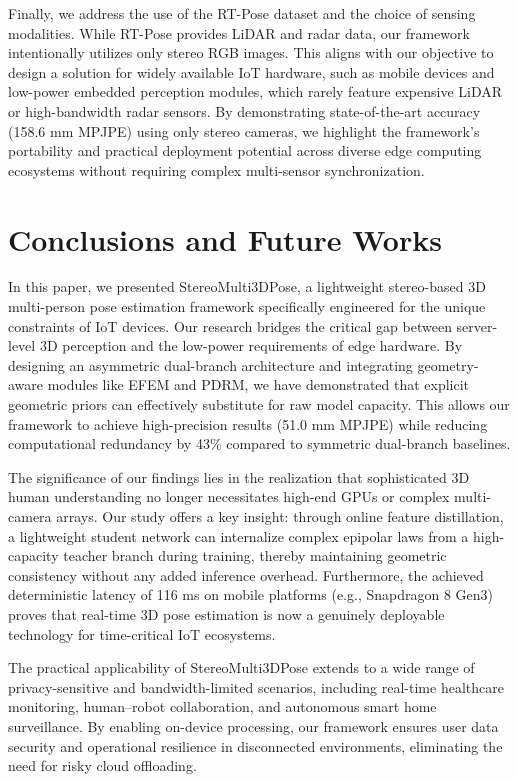 \documentclass[journal]{IEEEtran}
\begin{document}
Finally, we address the use of the RT-Pose dataset and the choice of sensing modalities. While RT-Pose provides LiDAR and radar data, our framework intentionally utilizes only stereo RGB images. This aligns with our objective to design a solution for widely available IoT hardware, such as mobile devices and low-power embedded perception modules, which rarely feature expensive LiDAR or high-bandwidth radar sensors. By demonstrating state-of-the-art accuracy (158.6 mm MPJPE) using only stereo cameras, we highlight the framework's portability and practical deployment potential across diverse edge computing ecosystems without requiring complex multi-sensor synchronization.

\section{Conclusions  and Future Works}




In this paper, we presented StereoMulti3DPose, a lightweight stereo-based 3D multi-person pose estimation framework specifically engineered for the unique constraints of IoT devices. Our research bridges the critical gap between server-level 3D perception and the low-power requirements of edge hardware. By designing an asymmetric dual-branch architecture and integrating geometry-aware modules like EFEM and PDRM, we have demonstrated that explicit geometric priors can effectively substitute for raw model capacity. This allows our framework to achieve high-precision results (51.0 mm MPJPE) while reducing computational redundancy by 43\% compared to symmetric dual-branch baselines.

The significance of our findings lies in the realization that sophisticated 3D human understanding no longer necessitates high-end GPUs or complex multi-camera arrays. Our study offers a key insight: through online feature distillation, a lightweight student network can internalize complex epipolar laws from a high-capacity teacher branch during training, thereby maintaining geometric consistency without any added inference overhead. Furthermore, the achieved deterministic latency of 116 ms on mobile platforms (e.g., Snapdragon 8 Gen3) proves that real-time 3D pose estimation is now a genuinely deployable technology for time-critical IoT ecosystems.

The practical applicability of StereoMulti3DPose extends to a wide range of privacy-sensitive and bandwidth-limited scenarios, including real-time healthcare monitoring, human–robot collaboration, and autonomous smart home surveillance. By enabling on-device processing, our framework ensures user data security and operational resilience in disconnected environments, eliminating the need for risky cloud offloading.
\end{document}
